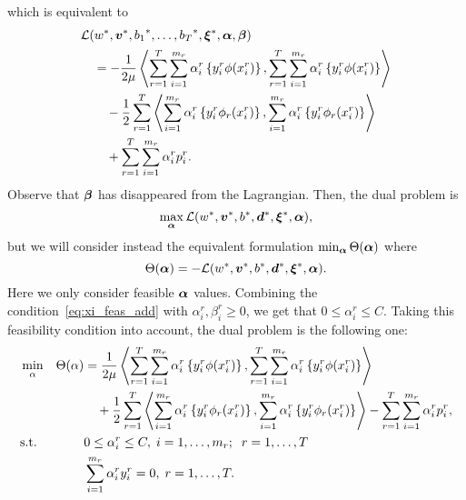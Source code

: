 which is equivalent to 
\begin{equation}
    \nonumber
    \begin{aligned}
        &  \mathcal{L}({{w}}^*, {\bm{v}}^*, {b_1}^*, \ldots, {b_T}^*, {\bm{\xi}}^*, \bm{\alpha}, \bm{\beta}) \\
        &\quad = - \frac{1}{2\mu} \bm{\left\langle}  \sum_{r= 1}^T \sum_{i=1}^{m_r} {\alpha_i^r} \left\lbrace y_i^r \phi({x}_i^r) \right\rbrace,  \sum_{r= 1}^T \sum_{i=1}^{m_r} {\alpha_i^r} \left\lbrace y_i^r \phi({x}_i^r) \right\rbrace \bm{\right\rangle} \\
        &\qquad - \frac{1}{2} \sum_{r= 1}^T {\bm{\left\langle} \sum_{i=1}^{m_r} {\alpha_i^r} \left\lbrace y_i^r \phi_r({x}_i^r) \right\rbrace, \sum_{i=1}^{m_r} {\alpha_i^r} \left\lbrace y_i^r \phi_r({x}_i^r) \right\rbrace \bm{\right\rangle}} \\
        &\qquad +  \sum_{r= 1}^T \sum_{i=1}^{m_r} \alpha_i^r  p_{i}^r .
    \end{aligned}
\end{equation}
Observe that $\bm{\beta}$ has disappeared from the Lagrangian.
Then, the dual problem is 
$$ \max_{\bm{\alpha}} \mathcal{L}({{w}}^*, {\bm{v}}^*, {b}^*, {\bm{d}}^*, {\bm{\xi}}^*, \bm{\alpha}),$$
but we will consider instead the equivalent formulation
$\min_{\bm{\alpha}} \Theta(\bm{\alpha})$ where 
$$ \Theta(\bm{\alpha}) = - \mathcal{L}({{w}}^*, {\bm{v}}^*, {b}^*, {\bm{d}}^*, {\bm{\xi}}^*, \bm{\alpha}). $$
Here we only consider feasible $\bm{\alpha}$ values.
Combining the condition~\eqref{eq:xi_feas_add} with $\alpha_i^r , \beta_i^r \geq 0$, we get that $0 \leq \alpha_i^r \leq C$. Taking this feasibility condition into account, the dual problem is the following one:
\begin{equation}\label{eq:svmmtl_dual_add}
    \begin{aligned}
    & \min_{\alpha} & \Theta(\alpha) &=  \frac{1}{2\mu} \dotp{ \sum_{r= 1}^T \sum_{i=1}^{m_r} {\alpha_i^r} \left\lbrace y_i^r \phi({x}_i^r) \right\rbrace}{ \sum_{r= 1}^T \sum_{i=1}^{m_r} {\alpha_i^r} \left\lbrace y_i^r \phi({x}_i^r) \right\rbrace} \\
    & & &\quad + \frac{1}{2} \sum_{r= 1}^T {\dotp{\sum_{i=1}^{m_r} {\alpha_i^r} \left\lbrace y_i^r \phi_r({x}_i^r) \right\rbrace}{\sum_{i=1}^{m_r} {\alpha_i^r} \left\lbrace y_i^r \phi_r({x}_i^r) \right\rbrace}}  - \sum_{r=1}^\ntasks \sum_{i=1}^{\npertask_r} \alpha_i^r p_i^r ,\\
    & \text{s.t.}
    & & 0 \leq \alpha_i^r \leq C , \; i=1, \ldots, \npertask_r;\;\; r=1, \ldots, \ntasks \\
    & & & \sum_{i=1}^{m_r} \alpha_i^r y_i^r = 0,\;  r=1, \ldots, \ntasks . \\
    \end{aligned}
\end{equation}
